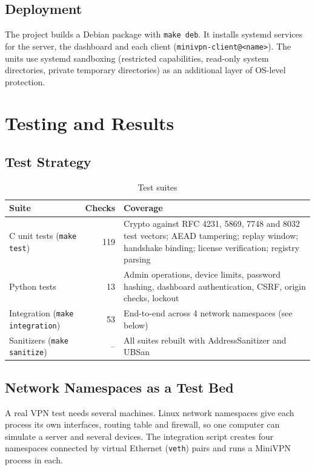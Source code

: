\documentclass[12pt,a4paper]{report}
\begin{document}
\section{Deployment}
The project builds a Debian package with \texttt{make deb}. It installs systemd services
for the server, the dashboard and each client (\texttt{minivpn-client@<name>}). The
units use systemd sandboxing (restricted capabilities, read-only system directories,
private temporary directories) as an additional layer of OS-level protection.

\chapter{Testing and Results}\label{ch:testing}

\section{Test Strategy}
\begin{table}[H]
\centering
\caption{Test suites}
\begin{tabularx}{\textwidth}{@{}lrX@{}}
\toprule
\textbf{Suite} & \textbf{Checks} & \textbf{Coverage}\\
\midrule
C unit tests (\texttt{make test}) & 119 & Crypto against RFC 4231, 5869, 7748 and 8032 test vectors; AEAD tampering; replay window; handshake binding; license verification; registry parsing\\
Python tests & 13 & Admin operations, device limits, password hashing, dashboard authentication, CSRF, origin checks, lockout\\
Integration (\texttt{make integration}) & 53 & End-to-end across 4 network namespaces (see below)\\
Sanitizers (\texttt{make sanitize}) & -- & All suites rebuilt with AddressSanitizer and UBSan\\
\bottomrule
\end{tabularx}
\end{table}

\section{Network Namespaces as a Test Bed}
A real VPN test needs several machines. Linux network namespaces give each process its
own interfaces, routing table and firewall, so one computer can simulate a server and
several devices. The integration script creates four namespaces connected by virtual
Ethernet (\texttt{veth}) pairs and runs a MiniVPN process in each.
\end{document}
